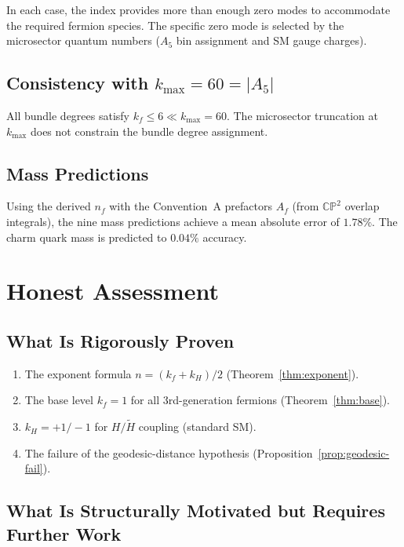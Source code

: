 \documentclass[11pt,a4paper]{article}
\newcommand{\CP}{\mathbb{CP}}
\theoremstyle{definition}
\theoremstyle{remark}
\begin{document}
In each case, the index provides more than enough zero modes to
accommodate the required fermion species.  The specific zero mode
is selected by the microsector quantum numbers ($A_5$ bin assignment
and SM gauge charges).

\subsection{Consistency with $k_{\max} = 60 = |A_5|$}

All bundle degrees satisfy $k_f \leq 6 \ll k_{\max} = 60$.
The microsector truncation at $k_{\max}$ does not constrain the
bundle degree assignment.

\subsection{Mass Predictions}

Using the derived $n_f$ with the Convention~A prefactors $A_f$
(from $\CP^2$ overlap integrals), the nine mass predictions achieve
a mean absolute error of $1.78\%$.  The charm quark mass is predicted
to $0.04\%$ accuracy.

\section{Honest Assessment}
\label{sec:honest}

\subsection{What Is Rigorously Proven}

\begin{enumerate}
\item The exponent formula $n = (k_f + k_H)/2$ (Theorem~\ref{thm:exponent}).
\item The base level $k_f = 1$ for all 3rd-generation fermions (Theorem~\ref{thm:base}).
\item $k_H = +1/-1$ for $H/\tilde{H}$ coupling (standard SM).
\item The failure of the geodesic-distance hypothesis (Proposition~\ref{prop:geodesic-fail}).
\end{enumerate}

\subsection{What Is Structurally Motivated but Requires Further Work}
\end{document}
